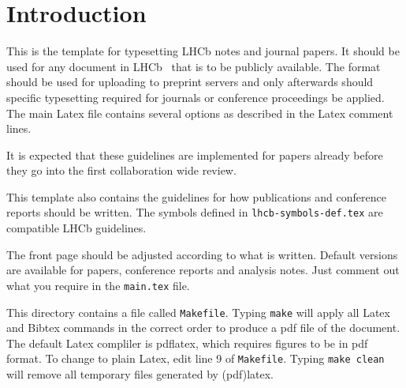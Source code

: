 
\section{Introduction}
\label{sec:Introduction}

This is the template for typesetting LHCb notes and journal papers.
It should be used for any document in LHCb~\cite{Alves:2008zz} that is to be
publicly available. The format should be used for uploading to
preprint servers and only afterwards should specific typesetting
required for journals or conference proceedings be applied. The main
Latex file contains several options as described in the Latex comment
lines.

It is expected that these guidelines are implemented for papers already
before they go into the first collaboration wide review. 

This template also contains the guidelines for how publications and
conference reports should be written. 
The symbols defined in \texttt{lhcb-symbols-def.tex} are compatible
LHCb guidelines.

The front page should be adjusted according to what is
written. Default versions are available for papers, conference reports
and analysis notes. Just comment out what you require in the
\texttt{main.tex} file.

This directory contains a file called \texttt{Makefile}.
Typing \texttt{make} will apply all Latex and Bibtex commands 
in the correct order to produce a pdf file of the document.
The default Latex compliler is pdflatex, which requires figures 
to be in pdf format. 
To change to plain Latex, edit line 9 of \texttt{Makefile}.
Typing \texttt{make clean} will remove all temporary files generated by (pdf)latex.
